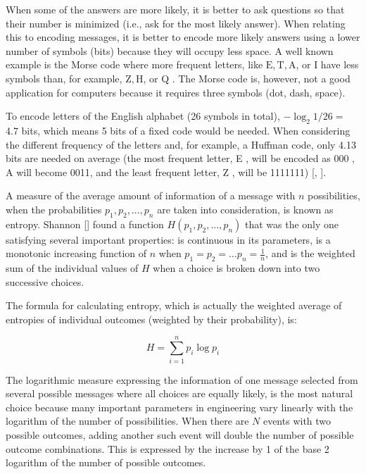When some of the answers are more likely, it is better to ask questions so that their number is minimized (i.e., ask for the most likely answer). When relating this to encoding messages, it is better to encode more likely answers using a lower number of symbols (bits) because they will occupy less space. A well known example is the Morse code where more frequent letters, like $\mathrm{E}, \mathrm{T}, \mathrm{A}$, or I have less symbols than, for example, $\mathrm{Z}, \mathrm{H}$, or Q . The Morse code is, however, not a good application for computers because it requires three symbols (dot, dash, space).

To encode letters of the English alphabet (26 symbols in total), $-\log _{2} 1 / 26=$ 4.7 bits, which means 5 bits of a fixed code would be needed. When considering the different frequency of the letters and, for example, a Huffman code, only 4.13 bits are needed on average (the most frequent letter, E , will be encoded as 000 , A will become 0011, and the least frequent letter, Z , will be 1111111) [\cite{ref266}, \cite{ref233}].

A measure of the average amount of information of a message with $n$ possibilities, when the probabilities $p_{1}, p_{2}, \ldots, p_{n}$ are taken into consideration, is known as entropy. Shannon [\cite{ref249}] found a function $H\left(p_{1}, p_{2}, \ldots, p_{n}\right)$ that was the only one satisfying several important properties: is continuous in its parameters, is a monotonic increasing function of $n$ when $p_{1}=p_{2}=\ldots p_{n}=\frac{1}{n}$, and is the weighted sum of the individual values of $H$ when a choice is broken down into two successive choices.

The formula for calculating entropy, which is actually the weighted average of entropies of individual outcomes (weighted by their probability), is:


\begin{equation*}
H=\sum_{i=1}^{n} p_{i} \log p_{i} \tag{14.6}
\end{equation*}


The logarithmic measure expressing the information of one message selected from several possible messages where all choices are equally likely, is the most natural choice because many important parameters in engineering vary linearly with the logarithm of the number of possibilities. When there are $N$ events with two possible outcomes, adding another such event will double the number of possible outcome combinations. This is expressed by the increase by 1 of the base 2 logarithm of the number of possible outcomes.


